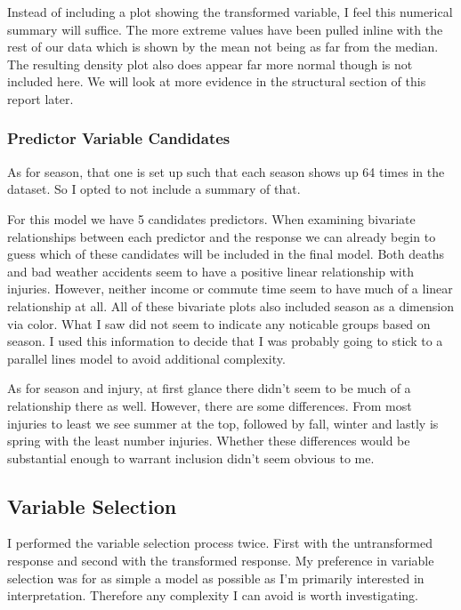 

Instead of including a plot showing the transformed variable, I feel this numerical summary will suffice. The more extreme values have been pulled inline with the rest of our data which is shown by the mean not being as far from the median. The resulting density plot also does appear far more normal though is not included here. We will look at more evidence in the structural section of this report later. 

\subsubsection*{Predictor Variable Candidates}



As for season, that one is set up such that each season shows up 64 times in the dataset. So I opted to not include a summary of that.

For this model we have 5 candidates predictors. When examining bivariate relationships between each predictor and the response we can already begin to guess which of these candidates will be included in the final model. Both deaths and bad weather accidents seem to have a positive linear relationship with injuries. However, neither income or commute time seem to have much of a linear relationship at all. All of these bivariate plots also included season as a dimension via color. What I saw did not seem to indicate any noticable groups based on season. I used this information to decide that I was probably going to stick to a parallel lines model to avoid additional complexity. 

As for season and injury, at first glance there didn't seem to be much of a relationship there as well. However, there are some differences. From most injuries to least we see summer at the top, followed by fall, winter and lastly is spring with the least number injuries. Whether these differences would be substantial enough to warrant inclusion didn't seem obvious to me. 

\subsection*{Variable Selection}

I performed the variable selection process twice. First with the untransformed response and second with the transformed response. My preference in variable selection was for as simple a model as possible as I'm primarily interested in interpretation. Therefore any complexity I can avoid is worth investigating.

